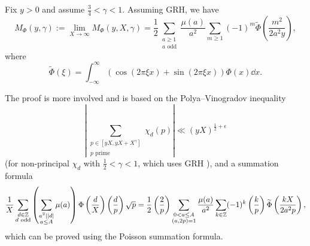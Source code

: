 \begin{theorem}
    \label{thm:lop_dirichlet_quad}
    Fix $y > 0$ and assume $\frac{3}{4} < \gamma < 1$.
    Assuming GRH, we have
    \begin{equation}
        M_{\Phi} (y, \gamma) := \lim_{X \to \infty} M_{\Phi}(y, X, \gamma) = \frac{1}{2} \sum_{\substack{a \ge 1 \\ a \text{ odd}}} \frac{\mu(a)}{a^2} \sum_{m \ge 1} (-1)^{m} \widetilde{\Phi} \left(\frac{m^2}{2 a^2 y}\right),
    \end{equation}
    where
    \begin{equation}
        \widetilde{\Phi}(\xi) = \int_{-\infty}^{\infty} (\cos(2 \pi \xi x) + \sin(2 \pi \xi x)) \Phi(x) \dd x.
    \end{equation}
\end{theorem}
The proof is more involved and is based on the Polya--Vinogradov inequality 
\[
\left|\sum_{\substack{p \in [yX, yX + X^\gamma] \\ p\text{ prime}}} \chi_d(p)\right| \ll (yX)^{\frac{1}{2} + \epsilon}
\]
(for non-principal $\chi_d$ with $\frac{1}{2} < \gamma < 1$, which uses GRH \cite{granville2007large}),
and a summation formula
\[
\frac{1}{X} \sum_{\substack{d \in \mathbb{Z} \\ d \text{ odd}}} \left(\sum_{\substack{a^2 \mid |d| \\ a \le A}} \mu(a)\right) \Phi\left(\frac{d}{X}\right) \left(\frac{d}{p}\right) \sqrt{p} = \frac{1}{2} \left(\frac{2}{p}\right) \sum_{\substack{0 < a \le A \\ (a, 2p) = 1}} \frac{\mu(a)}{a^2} \sum_{k \in \mathbb{Z}} (-1)^k \left(\frac{k}{p}\right) \widetilde{\Phi} \left(\frac{k X}{2 a^2 p}\right),
\]
which can be proved using the Poisson summation formula.

